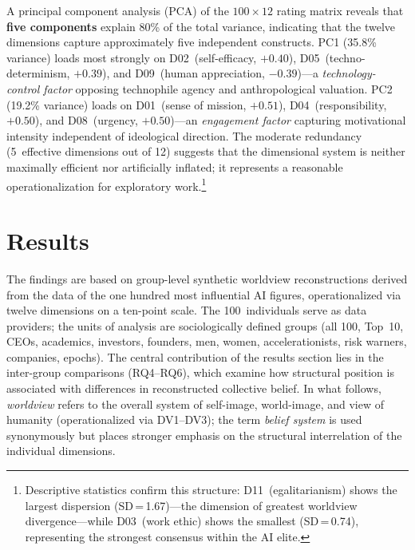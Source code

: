 \documentclass[12pt,a4paper]{article}
\begin{document}
A principal component analysis (PCA) of the $100 \times 12$ rating matrix reveals that \textbf{five components} explain 80\% of the total variance, indicating that the twelve dimensions capture approximately five independent constructs. PC1 (35.8\% variance) loads most strongly on D02~(self-efficacy, $+0.40$), D05~(techno-determinism, $+0.39$), and D09~(human appreciation, $-0.39$)---a \emph{technology-control factor} opposing technophile agency and anthropological valuation. PC2 (19.2\% variance) loads on D01~(sense of mission, $+0.51$), D04~(responsibility, $+0.50$), and D08~(urgency, $+0.50$)---an \emph{engagement factor} capturing motivational intensity independent of ideological direction. The moderate redundancy (5~effective dimensions out of 12) suggests that the dimensional system is neither maximally efficient nor artificially inflated; it represents a reasonable operationalization for exploratory work.\footnote{Descriptive statistics confirm this structure: D11~(egalitarianism) shows the largest dispersion (SD\,=\,1.67)---the dimension of greatest worldview divergence---while D03~(work ethic) shows the smallest (SD\,=\,0.74), representing the strongest consensus within the AI elite.}


\section{Results}
\label{sec:ergebnisse}

The findings are based on group-level synthetic worldview reconstructions derived from the data of the one hundred most influential AI figures, operationalized via twelve dimensions on a ten-point scale. The 100~individuals serve as data providers; the units of analysis are sociologically defined groups (all 100, Top~10, CEOs, academics, investors, founders, men, women, accelerationists, risk warners, companies, epochs). The central contribution of the results section lies in the inter-group comparisons (RQ4--RQ6), which examine how structural position is associated with differences in reconstructed collective belief. In what follows, \emph{worldview} refers to the overall system of self-image, world-image, and view of humanity (operationalized via DV1--DV3); the term \emph{belief system} is used synonymously but places stronger emphasis on the structural interrelation of the individual dimensions.
\end{document}
